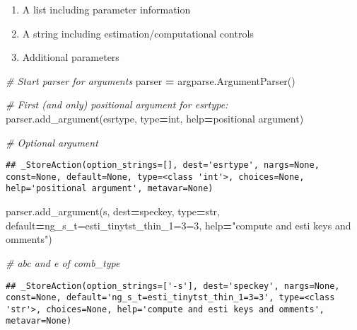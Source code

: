 \documentclass[
]{book}
\newenvironment{Shaded}{\begin{snugshade}}{\end{snugshade}}
\newcommand{\BuiltInTok}[1]{#1}
\newcommand{\CommentTok}[1]{\textcolor[rgb]{0.56,0.35,0.01}{\textit{#1}}}
\newcommand{\NormalTok}[1]{#1}
\newcommand{\OperatorTok}[1]{\textcolor[rgb]{0.81,0.36,0.00}{\textbf{#1}}}
\newcommand{\StringTok}[1]{\textcolor[rgb]{0.31,0.60,0.02}{#1}}
\providecommand{\tightlist}{%
  \setlength{\itemsep}{0pt}\setlength{\parskip}{0pt}}
\begin{document}
\begin{enumerate}
\def\labelenumi{\arabic{enumi}.}
\tightlist
\item
  A list including parameter information
\item
  A string including estimation/computational controls
\item
  Additional parameters
\end{enumerate}

\begin{Shaded}
\begin{Highlighting}[]
\CommentTok{\# Start parser for arguments}
\NormalTok{parser }\OperatorTok{=}\NormalTok{ argparse.ArgumentParser()}

\CommentTok{\# First (and only) positional argument for esrtype:}
\NormalTok{parser.add\_argument(}\StringTok{\textquotesingle{}esrtype\textquotesingle{}}\NormalTok{, }\BuiltInTok{type}\OperatorTok{=}\BuiltInTok{int}\NormalTok{, }\BuiltInTok{help}\OperatorTok{=}\StringTok{\textquotesingle{}positional argument\textquotesingle{}}\NormalTok{)}

\CommentTok{\# Optional argument}
\end{Highlighting}
\end{Shaded}

\begin{verbatim}
## _StoreAction(option_strings=[], dest='esrtype', nargs=None, const=None, default=None, type=<class 'int'>, choices=None, help='positional argument', metavar=None)
\end{verbatim}

\begin{Shaded}
\begin{Highlighting}[]
\NormalTok{parser.add\_argument(}\StringTok{\textquotesingle{}{-}s\textquotesingle{}}\NormalTok{, dest}\OperatorTok{=}\StringTok{\textquotesingle{}speckey\textquotesingle{}}\NormalTok{, }\BuiltInTok{type}\OperatorTok{=}\BuiltInTok{str}\NormalTok{,}
\NormalTok{                    default}\OperatorTok{=}\StringTok{\textquotesingle{}ng\_s\_t=esti\_tinytst\_thin\_1=3=3\textquotesingle{}}\NormalTok{,}
                    \BuiltInTok{help}\OperatorTok{=}\StringTok{"compute and esti keys and omments"}\NormalTok{)}

\CommentTok{\# abc and e of comb\_type}
\end{Highlighting}
\end{Shaded}

\begin{verbatim}
## _StoreAction(option_strings=['-s'], dest='speckey', nargs=None, const=None, default='ng_s_t=esti_tinytst_thin_1=3=3', type=<class 'str'>, choices=None, help='compute and esti keys and omments', metavar=None)
\end{verbatim}
\end{document}
